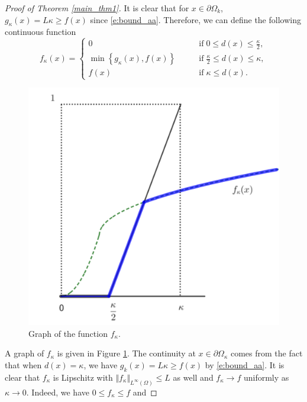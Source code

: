 \documentclass[12pt,reqno]{amsart}
\numberwithin{figure}{section}
\theoremstyle{plain}
\theoremstyle{remark}
\numberwithin{equation}{section}
\begin{document}
\begin{proof}[Proof of Theorem \ref{main_thm1}]
\noindent
It is clear that for $x\in \partial\Omega_k$, $g_\kappa(x) = L\kappa \geq f(x)$ since \eqref{e:bound_aa}. Therefore, we can define the following continuous function
\begin{equation}\label{def_f_kappa}
    f_\kappa(x) = 
    \begin{cases}
        0             &\qquad\text{if}\;0\leq d(x) \leq \frac{\kappa}{2},\\
        \min \left\lbrace g_\kappa(x), f(x) \right\rbrace &\qquad\text{if}\;\frac{\kappa}{2}\leq d(x) \leq \kappa,\\
        f(x) &\qquad\text{if}\;\kappa \leq d(x).
    \end{cases}
\end{equation}
\begin{figure}[h]
    \centering
    \includegraphics[scale=0.40]{Drafts and notes/fig1.png}
    \caption{Graph of the function $f_\kappa$.}
    \label{fig:f_kappa}
\end{figure}
A graph of $f_\kappa$ is given in Figure \ref{fig:f_kappa}. The continuity at $x\in \partial\Omega_\kappa$ comes from the fact that when $d(x) =\kappa$, we have $g_k(x) = L\kappa \geq f(x)$ by \eqref{e:bound_aa}. It is clear that $f_\kappa$ is Lipschitz with $\Vert f_\kappa\Vert_{L^\infty(\Omega)}\leq L$ as well and $f_\kappa\to f$ uniformly as $\kappa\to 0$. Indeed, we have $0\leq f_\kappa \leq f$ and

\end{proof}
\end{document}

